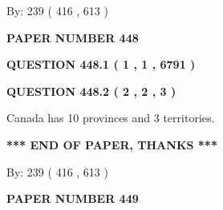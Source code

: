 \documentclass[12pt]{article}
\begin{document}
   
\hspace{1.0in} By: 
 239 ( 416 ,  613 )
   
   
   
   
\newpage 
\setcounter{page}{ 
   448001 } 
   
   
   
   
 {\textbf{ \Large{ PAPER NUMBER  448  }}}
   
   
\vspace{0.2in}
   
   
   
   
   
   
 \vspace{0.2in}
 
 
 
 
   
   
  
\vspace{0.2in}
  
{\textbf{\Large{QUESTION
448.1 
 ( 1 , 1 , 6791 )
}}}
  
  
  
\vspace{0.2in}
  
{\textbf{\Large{QUESTION
448.2 
 ( 2 , 2 , 3 )
}}}
  
  
 
 
\noindent{}
 
 
Canada has 10  provinces and 3 territories.
 
 
 
 
   
   
 \vspace{0.2in}
 
   
   
   
   
\vspace{1.0in} 
{\textbf{\large{ *** END OF PAPER, THANKS *** }}} 
   
   
\hspace{1.0in} By: 
 239 ( 416 ,  613 )
   
   
   
   
\newpage 
\setcounter{page}{ 
   449001 } 
   
   
   
   
 {\textbf{ \Large{ PAPER NUMBER  449  }}}
   
\end{document}
